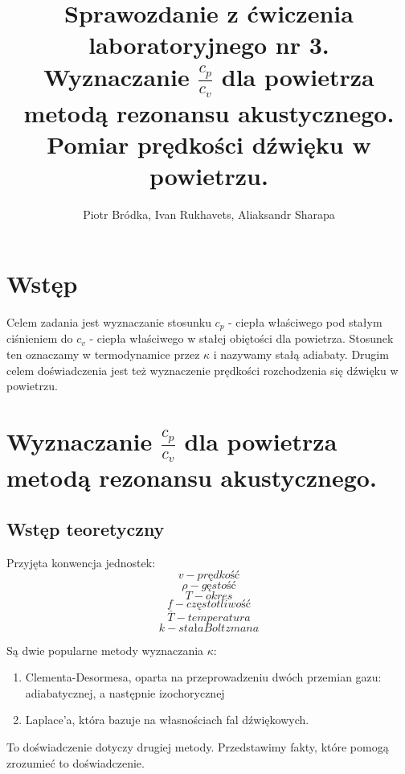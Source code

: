 \documentclass[12pt,a4paper]{article}
\begin{document}
\begin{titlepage}


\title{%
Sprawozdanie z ćwiczenia laboratoryjnego nr 3.\\
\large  Wyznaczanie $\frac{c_p}{c_v}$ dla powietrza metodą rezonansu akustycznego. Pomiar prędkości dźwięku w powietrzu.}

\author{Piotr Bródka, Ivan Rukhavets, Aliaksandr Sharapa}


\maketitle
\end{titlepage}

\section{Wstęp}
Celem zadania jest wyznaczanie stosunku $c_p$ - ciepła właściwego pod stałym ciśnieniem do $c_v$ - ciepła właściwego w stałej obiętości dla powietrza. Stosunek ten oznaczamy w termodynamice przez $\kappa$ i nazywamy stałą adiabaty.
Drugim celem doświadczenia jest też wyznaczenie prędkości rozchodzenia się dźwięku w powietrzu.


\section{Wyznaczanie $\frac{c_p}{c_v}$ dla powietrza metodą rezonansu akustycznego.} 

\subsection{Wstęp teoretyczny}
Przyjęta konwencja jednostek:
$$
v - prędkość
$$
$$
\rho - gęstość
$$
$$
T - okres
$$
$$
f - częstotliwość
$$
$$
\bar{T} - temperatura
$$
$$
k - stała Boltzmana
$$



Są dwie popularne metody wyznaczania $\kappa$:
\begin{enumerate}
\item Clementa-Desormesa, oparta na przeprowadzeniu dwóch przemian gazu: adiabatycznej, a następnie izochorycznej \item Laplace'a, która bazuje na własnościach fal dźwiękowych. 
\end{enumerate} 

To doświadczenie dotyczy drugiej metody. Przedstawimy fakty, które pomogą zrozumieć to doświadczenie.
\end{document}
